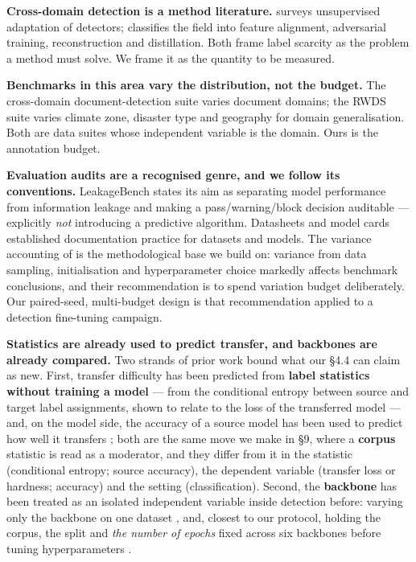 \documentclass[pdflatex,sn-mathphys-ay]{sn-jnl}
\begin{document}
\textbf{Cross-domain detection is a method literature.} \citep{oza2024} surveys unsupervised adaptation of detectors; \citep{zhou2025} classifies the field into feature alignment, adversarial training, reconstruction and distillation. Both frame label scarcity as the problem a method must solve. We frame it as the quantity to be measured.

\textbf{Benchmarks in this area vary the distribution, not the budget.} The cross-domain document-detection suite \citep{li2020} varies document domains; the RWDS suite \citep{alemadi2025} varies climate zone, disaster type and geography for domain generalisation. Both are data suites whose independent variable is the domain. Ours is the annotation budget.

\textbf{Evaluation audits are a recognised genre, and we follow its conventions.} LeakageBench \citep{chegondi2026} states its aim as separating model performance from information leakage and making a pass/warning/block decision auditable --- explicitly \emph{not} introducing a predictive algorithm. Datasheets and model cards \citep{gebru2021,mitchell2019} established documentation practice for datasets and models. The variance accounting of \citep{bouthillier2021} is the methodological base we build on: variance from data sampling, initialisation and hyperparameter choice markedly affects benchmark conclusions, and their recommendation is to spend variation budget deliberately. Our paired-seed, multi-budget design is that recommendation applied to a detection fine-tuning campaign.

\textbf{Statistics are already used to predict transfer, and backbones are already compared.} Two strands of prior work bound what our \S{}4.4 can claim as new. First, transfer difficulty has been predicted from \textbf{label statistics without training a model} --- from the conditional entropy between source and target label assignments, shown to relate to the loss of the transferred model \citep{tran2019} --- and, on the model side, the accuracy of a source model has been used to predict how well it transfers \citep{kornblith2019}; both are the same move we make in \S{}9, where a \textbf{corpus} statistic is read as a moderator, and they differ from it in the statistic (conditional entropy; source accuracy), the dependent variable (transfer loss or hardness; accuracy) and the setting (classification). Second, the \textbf{backbone} has been treated as an isolated independent variable inside detection before: varying only the backbone on one dataset \citep{ding2023}, and, closest to our protocol, holding the corpus, the split and \emph{the number of epochs} fixed across six backbones before tuning hyperparameters \citep{mahadevkar2024}.
\end{document}
